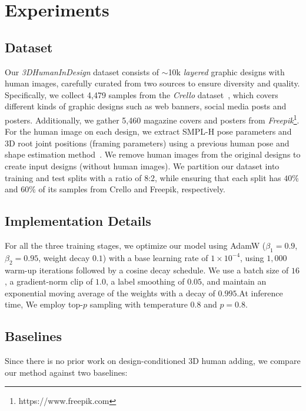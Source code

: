 \section{Experiments}

\subsection{Dataset}
\label{sec:dataset}

Our \textit{3DHumanInDesign} dataset consists of $\sim$10k \textit{layered} graphic designs with human images, carefully curated from two sources to ensure diversity and quality. Specifically, we collect 4,479 samples from the \textit{Crello} dataset~\cite{yamaguchi2021canvasvae}, which covers different kinds of graphic designs such as web banners, social media posts and posters.
Additionally, we gather 5,460 magazine covers and posters from \textit{Freepik}\footnote{https://www.freepik.com}.
For the human image on each design, we extract SMPL-H pose parameters and 3D root joint positions (framing parameters) 
using a previous human pose and shape estimation method~\cite{aios}. 
We remove human images from the original designs to create input designs (without human images).
We partition our dataset into training and test splits with a ratio of 8:2, while ensuring that each split has $40 \%$ and $60 \%$ of its samples from Crello and Freepik, respectively.

\subsection{Implementation Details}

For all the three training stages, we optimize our model using AdamW ($\beta_1 = 0.9$, $\beta_2 = 0.95$, weight decay $0.1$) with a base learning rate of $1\times10^{-4}$, using $1{,}000$ warm-up iterations followed by a cosine decay schedule. We use a batch size of $16$, a gradient-norm clip of $1.0$, a label smoothing of $0.05$, and maintain an exponential moving average of the weights with a decay of $0.995$.At inference time, We employ top-$p$ sampling with temperature $0.8$ and $p = 0.8$.

\subsection{Baselines}

Since there is no prior work on design-conditioned 3D human adding, we compare our method against two baselines:

